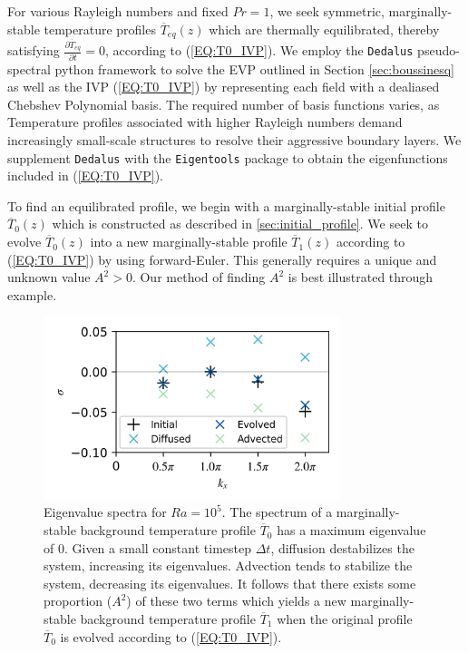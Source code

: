 \documentclass[twocolumn,showpacs,amsmath,amssymb]{revtex4}
\def\bar{\overline}
\begin{document}
\par For various Rayleigh numbers and fixed $Pr = 1$, we seek symmetric, marginally-stable temperature profiles $\bar{T}_{eq}(z)$ which are thermally equilibrated, thereby satisfying $\frac{\partial \bar{T}_{eq}}{\partial t} = 0$, according to (\ref{EQ:T0_IVP}). We employ the \texttt{Dedalus} pseudo-spectral python framework to solve the EVP outlined in Section \ref{sec:boussinesq} as well as the IVP (\ref{EQ:T0_IVP}) by representing each field with a dealiased Chebshev Polynomial basis. The required number of basis functions varies, as Temperature profiles associated with higher Rayleigh numbers demand increasingly small-scale structures to resolve their aggressive boundary layers. We supplement \texttt{Dedalus} with the \texttt{Eigentools} package to obtain the eigenfunctions included in (\ref{EQ:T0_IVP}).
\par To find an equilibrated profile, we begin with a marginally-stable initial profile $\bar{T}_0(z)$ which is constructed as described in \ref{sec:initial_profile}. We seek to evolve $\bar{T}_0(z)$ into a new marginally-stable profile $\bar{T}_1(z)$ according to (\ref{EQ:T0_IVP}) by using forward-Euler. This generally requires a unique and unknown value $A^2 > 0$. Our method of finding $A^2$ is best illustrated through example.

\begin{figure}[h]
    \includegraphics[width=3.4in]{EV_spectrum_ol.png}
    \caption{Eigenvalue spectra for $Ra = 10^5$. The spectrum of a marginally-stable background temperature profile $\bar{T}_0$ has a maximum eigenvalue of 0. Given a small constant timestep $\Delta t$, diffusion destabilizes the system, increasing its eigenvalues. Advection tends to stabilize the system, decreasing its eigenvalues. It follows that there exists some proportion ($A^2$) of these two terms which yields a new marginally-stable background temperature profile $\bar{T}_1$ when the original profile $\bar{T}_0$ is evolved according to (\ref{EQ:T0_IVP}).}
    \label{fig:iteration_spectra} 
\end{figure}
\end{document}
